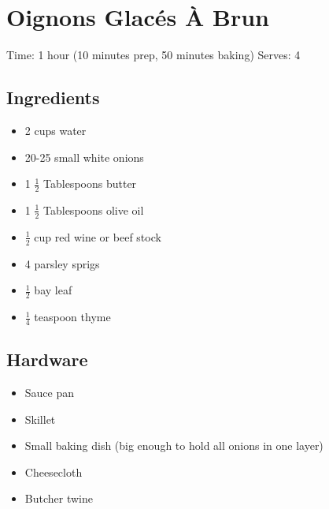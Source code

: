 \section{Oignons Glacés À Brun}
\label{oignonsGlacesABrun}
\setcounter{secnumdepth}{0}
Time: 1 hour (10 minutes prep, 50 minutes baking)
Serves: 4

\begin{multicols}{2}
\subsection*{Ingredients}
\begin{itemize}
    \item 2 cups water
    \item 20-25 small white onions
    \item 1 \( \frac{1}{2} \) Tablespoons butter
    \item 1 \( \frac{1}{2} \) Tablespoons olive oil
    \item \( \frac{1}{2} \) cup red wine or beef stock
    \item 4 parsley sprigs
    \item \( \frac{1}{2} \) bay leaf
    \item \( \frac{1}{4} \) teaspoon thyme
\end{itemize}

\subsection*{Hardware}
\begin{itemize}
    \item Sauce pan
    \item Skillet
    \item Small baking dish (big enough to hold all onions in one layer)
    \item Cheesecloth
    \item Butcher twine
\end{itemize}
\clearpage


\end{multicols}
